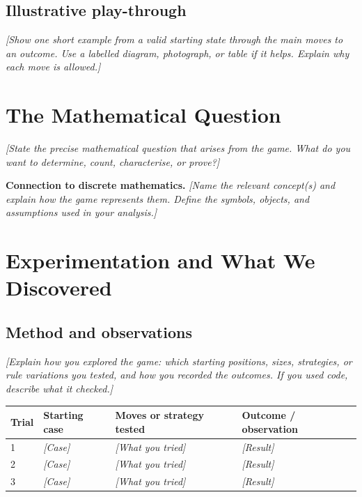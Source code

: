 \documentclass[11pt,a4paper]{article}
\newif\ifshowguidance
\newcommand{\placeholder}[1]{\textit{[#1]}}
\newcommand{\guidance}[1]{%
  \ifshowguidance
    \par\smallskip\noindent
    \begingroup\setlength{\fboxsep}{8pt}%
    \colorbox{guidebg}{\parbox{\dimexpr\linewidth-2\fboxsep\relax}{%
      \small\color{guidetext}#1}}\endgroup\par\smallskip
  \fi}
\begin{document}
\subsection{Illustrative play-through}
\placeholder{Show one short example from a valid starting state through the
main moves to an outcome. Use a labelled diagram, photograph, or table if it
helps. Explain why each move is allowed.}


\section{The Mathematical Question}
\placeholder{State the precise mathematical question that arises from the
game. What do you want to determine, count, characterise, or prove?}

\textbf{Connection to discrete mathematics.}
\placeholder{Name the relevant concept(s) and explain how the game represents
them. Define the symbols, objects, and assumptions used in your analysis.}

\newpage
\section{Experimentation and What We Discovered}

\subsection{Method and observations}
\placeholder{Explain how you explored the game: which starting positions,
sizes, strategies, or rule variations you tested, and how you recorded the
outcomes. If you used code, describe what it checked.}

\guidance{Record actual trials. Distinguish one play-through from an exhaustive
check of all possibilities. Add or modify rows and columns to suit your game.}

\begin{tabularx}{\textwidth}{@{}P{1cm}Y Y Y@{}}
\toprule
\textbf{Trial} & \textbf{Starting case} & \textbf{Moves or strategy tested}
  & \textbf{Outcome / observation} \\
 & \placeholder{Case} & \placeholder{What you tried} & \placeholder{Result} \\
2 & \placeholder{Case} & \placeholder{What you tried} & \placeholder{Result} \\
3 & \placeholder{Case} & \placeholder{What you tried} & \placeholder{Result} \\
\bottomrule
\end{tabularx}
\end{document}
